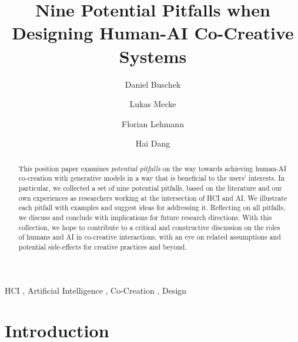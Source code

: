 \documentclass[
twocolumn,
]{ceurart}
\begin{document}


\title{Nine Potential Pitfalls when Designing Human-AI Co-Creative Systems}


\author[1]{Daniel Buschek}

\author[2,3]{Lukas Mecke}

\author[1]{Florian Lehmann}

\author[1]{Hai Dang}

\address[1]{Research Group HCI + AI, Department of Computer Science, University of Bayreuth, Bayreuth, Germany
}
\address[2]{Bundeswehr University Munich, Munich, Germany
}
\address[3]{LMU Munich, Munich, Germany
}


\begin{abstract}
This position paper examines \textit{potential pitfalls} on the way towards achieving human-AI co-creation with generative models in a way that is beneficial to the users' interests.
In particular, we collected a set of nine potential pitfalls, based on the literature and our own experiences as researchers working at the intersection of HCI and AI. We illustrate each pitfall with examples and suggest ideas for addressing it. 
Reflecting on all pitfalls, we discuss and conclude with implications for future research directions.
With this collection, we hope to contribute to a critical and constructive discussion on the roles of humans and AI in co-creative interactions, with an eye on related assumptions and potential side-effects for creative practices and beyond. 
\end{abstract}

\begin{keywords}
    HCI \sep
    Artificial Intelligence \sep 
    Co-Creation \sep 
    Design
\end{keywords}

\maketitle

\section{Introduction}
\end{document}
